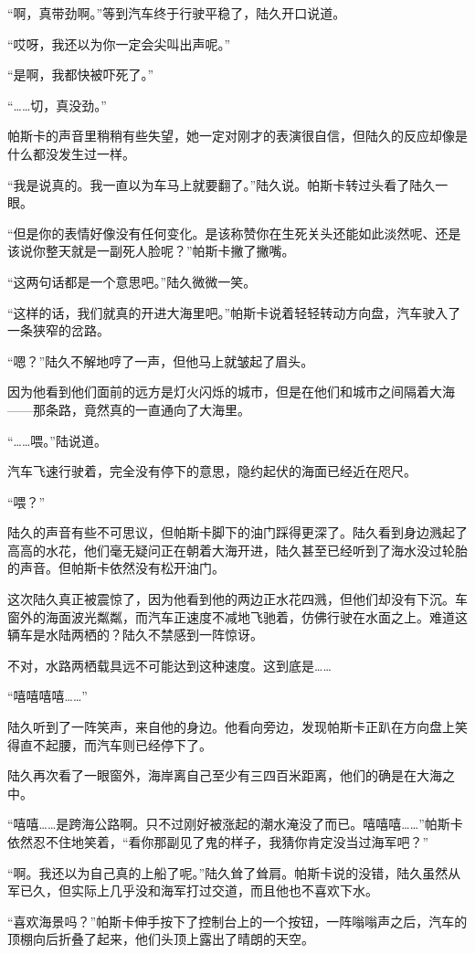 “啊，真带劲啊。”等到汽车终于行驶平稳了，陆久开口说道。

“哎呀，我还以为你一定会尖叫出声呢。”

“是啊，我都快被吓死了。”

“……切，真没劲。”

帕斯卡的声音里稍稍有些失望，她一定对刚才的表演很自信，但陆久的反应却像是什么都没发生过一样。

“我是说真的。我一直以为车马上就要翻了。”陆久说。帕斯卡转过头看了陆久一眼。

“但是你的表情好像没有任何变化。是该称赞你在生死关头还能如此淡然呢、还是该说你整天就是一副死人脸呢？”帕斯卡撇了撇嘴。

“这两句话都是一个意思吧。”陆久微微一笑。

“这样的话，我们就真的开进大海里吧。”帕斯卡说着轻轻转动方向盘，汽车驶入了一条狭窄的岔路。

“嗯？”陆久不解地哼了一声，但他马上就皱起了眉头。

因为他看到他们面前的远方是灯火闪烁的城市，但是在他们和城市之间隔着大海——那条路，竟然真的一直通向了大海里。

“……喂。”陆说道。

汽车飞速行驶着，完全没有停下的意思，隐约起伏的海面已经近在咫尺。

“喂？”

陆久的声音有些不可思议，但帕斯卡脚下的油门踩得更深了。陆久看到身边溅起了高高的水花，他们毫无疑问正在朝着大海开进，陆久甚至已经听到了海水没过轮胎的声音。但帕斯卡依然没有松开油门。

这次陆久真正被震惊了，因为他看到他的两边正水花四溅，但他们却没有下沉。车窗外的海面波光粼粼，而汽车正速度不减地飞驰着，仿佛行驶在水面之上。难道这辆车是水陆两栖的？陆久不禁感到一阵惊讶。

不对，水路两栖载具远不可能达到这种速度。这到底是……

“嘻嘻嘻嘻……”

陆久听到了一阵笑声，来自他的身边。他看向旁边，发现帕斯卡正趴在方向盘上笑得直不起腰，而汽车则已经停下了。

陆久再次看了一眼窗外，海岸离自己至少有三四百米距离，他们的确是在大海之中。

“嘻嘻……是跨海公路啊。只不过刚好被涨起的潮水淹没了而已。嘻嘻嘻……”帕斯卡依然忍不住地笑着，“看你那副见了鬼的样子，我猜你肯定没当过海军吧？”

“啊。我还以为自己真的上船了呢。”陆久耸了耸肩。帕斯卡说的没错，陆久虽然从军已久，但实际上几乎没和海军打过交道，而且他也不喜欢下水。

“喜欢海景吗？”帕斯卡伸手按下了控制台上的一个按钮，一阵嗡嗡声之后，汽车的顶棚向后折叠了起来，他们头顶上露出了晴朗的天空。

